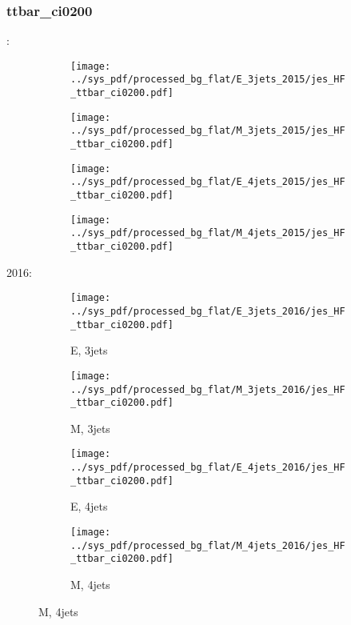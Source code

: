 \documentclass{beamer}
\begin{document}
\begin{frame}
\frametitle{ttbar_ci0200}
\fontsize{5}{1}:
\begin{figure}
\centering
\begin{subfigure}[b]{0.24\textwidth}
\texttt{[image: ../sys\_pdf/processed\_bg\_flat/E\_3jets\_2015/jes\_HF\_ttbar\_ci0200.pdf]}
\end{subfigure}
\begin{subfigure}[b]{0.24\textwidth}
\texttt{[image: ../sys\_pdf/processed\_bg\_flat/M\_3jets\_2015/jes\_HF\_ttbar\_ci0200.pdf]}
\end{subfigure}
\begin{subfigure}[b]{0.24\textwidth}
\texttt{[image: ../sys\_pdf/processed\_bg\_flat/E\_4jets\_2015/jes\_HF\_ttbar\_ci0200.pdf]}
\end{subfigure}
\begin{subfigure}[b]{0.24\textwidth}
\texttt{[image: ../sys\_pdf/processed\_bg\_flat/M\_4jets\_2015/jes\_HF\_ttbar\_ci0200.pdf]}
\end{subfigure}
\end{figure}
2016:
\begin{figure}
\centering
\begin{subfigure}[b]{0.24\textwidth}
\texttt{[image: ../sys\_pdf/processed\_bg\_flat/E\_3jets\_2016/jes\_HF\_ttbar\_ci0200.pdf]}
\captionsetup{font=tiny}
\caption{E, 3jets}
\end{subfigure}
\begin{subfigure}[b]{0.24\textwidth}
\texttt{[image: ../sys\_pdf/processed\_bg\_flat/M\_3jets\_2016/jes\_HF\_ttbar\_ci0200.pdf]}
\captionsetup{font=tiny}
\caption{M, 3jets}
\end{subfigure}
\begin{subfigure}[b]{0.24\textwidth}
\texttt{[image: ../sys\_pdf/processed\_bg\_flat/E\_4jets\_2016/jes\_HF\_ttbar\_ci0200.pdf]}
\captionsetup{font=tiny}
\caption{E, 4jets}
\end{subfigure}
\begin{subfigure}[b]{0.24\textwidth}
\texttt{[image: ../sys\_pdf/processed\_bg\_flat/M\_4jets\_2016/jes\_HF\_ttbar\_ci0200.pdf]}
\captionsetup{font=tiny}
\caption{M, 4jets}
\end{subfigure}
\end{figure}
\end{frame}
\end{document}
